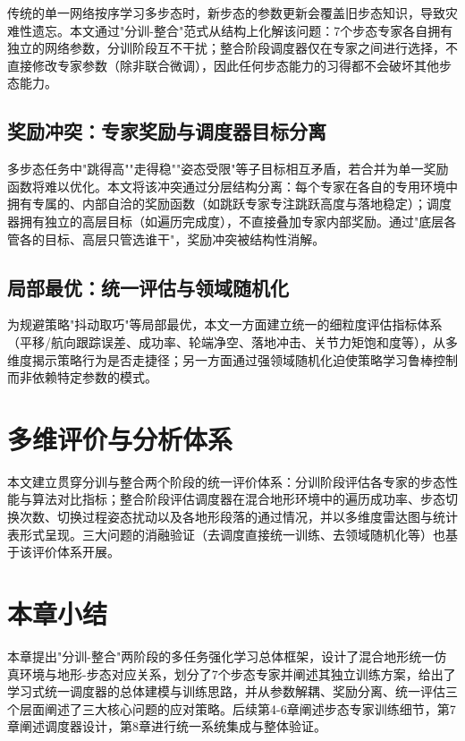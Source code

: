 传统的单一网络按序学习多步态时，新步态的参数更新会覆盖旧步态知识，导致灾难性遗忘\cite{mccloskey1989,kirkpatrick2017}。本文通过"分训-整合"范式从结构上化解该问题：7个步态专家各自拥有独立的网络参数，分训阶段互不干扰；整合阶段调度器仅在专家之间进行选择，不直接修改专家参数（除非联合微调），因此任何步态能力的习得都不会破坏其他步态能力。

\subsection{奖励冲突：专家奖励与调度器目标分离}

多步态任务中"跳得高""走得稳""姿态受限"等子目标相互矛盾，若合并为单一奖励函数将难以优化。本文将该冲突通过分层结构分离：每个专家在各自的专用环境中拥有专属的、内部自洽的奖励函数（如跳跃专家专注跳跃高度与落地稳定）；调度器拥有独立的高层目标（如遍历完成度），不直接叠加专家内部奖励。通过"底层各管各的目标、高层只管选谁干"，奖励冲突被结构性消解。

\subsection{局部最优：统一评估与领域随机化}

为规避策略"抖动取巧"等局部最优，本文一方面建立统一的细粒度评估指标体系（平移/航向跟踪误差、成功率、轮端净空、落地冲击、关节力矩饱和度等），从多维度揭示策略行为是否走捷径；另一方面通过强领域随机化迫使策略学习鲁棒控制而非依赖特定参数的模式。

\section{多维评价与分析体系}

本文建立贯穿分训与整合两个阶段的统一评价体系：分训阶段评估各专家的步态性能与算法对比指标；整合阶段评估调度器在混合地形环境中的遍历成功率、步态切换次数、切换过程姿态扰动以及各地形段落的通过情况，并以多维度雷达图与统计表形式呈现。三大问题的消融验证（去调度直接统一训练、去领域随机化等）也基于该评价体系开展。

\section{本章小结}

本章提出"分训-整合"两阶段的多任务强化学习总体框架，设计了混合地形统一仿真环境与地形-步态对应关系，划分了7个步态专家并阐述其独立训练方案，给出了学习式统一调度器的总体建模与训练思路，并从参数解耦、奖励分离、统一评估三个层面阐述了三大核心问题的应对策略。后续第4-6章阐述步态专家训练细节，第7章阐述调度器设计，第8章进行统一系统集成与整体验证。
